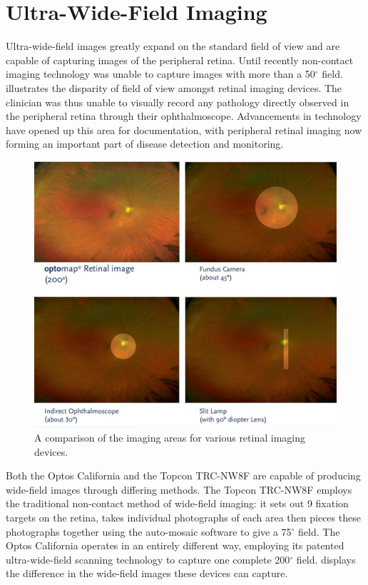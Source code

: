 \section{Ultra-Wide-Field Imaging}

Ultra-wide-field images greatly expand on the standard field of view and are
capable of capturing images of the peripheral retina. Until recently
non-contact imaging technology was unable to capture images with more
than a 50$^\circ$ field.  illustrates the disparity of
field of view amongst retinal imaging devices. The clinician was thus
unable to visually record any pathology directly observed in the peripheral
retina through their ophthalmoscope. Advancements in technology have opened
up this area for documentation, with peripheral retinal imaging now forming
an important part of disease detection and monitoring.\cite{8_sides_media_2015}

\begin{figure}[htbp]
\centering
 \includegraphics{figures/uwfcomparison}
\caption{A comparison of the imaging areas for various retinal imaging devices.}
\label{fig:uwfc}
    \end{figure}

Both the Optos California and the Topcon TRC-NW8F are capable of producing
wide-field images through differing methods. The Topcon TRC-NW8F employs
the traditional non-contact method of wide-field imaging: it sets out 9
fixation targets on the retina, takes individual photographs of each area
then pieces these photographs together using the auto-mosaic software to
give a 75$^\circ$ field. The Optos California operates in an entirely
different way, employing its patented ultra-wide-field scanning technology
to capture one complete 200$^\circ$ field.  displays the
difference in the wide-field images these devices can capture.

